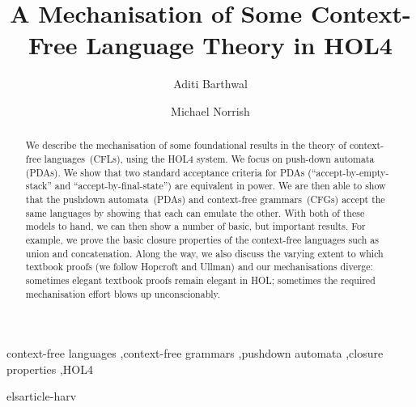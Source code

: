 \documentclass[1p,review,authoryear]{elsarticle}
\begin{document}
\begin{frontmatter}
\date{}

\title{A Mechanisation of Some Context-Free Language Theory in HOL4}

\author[ab]{Aditi Barthwal}
\author[mn]{ Michael Norrish}
\address[ab]{Australian National University}
\address[mn]{Canberra Research Lab., NICTA}



\begin{abstract}
We describe the mechanisation of some foundational results in the theory of context-free languages~(CFLs), using the HOL4 system.
We focus on push-down automata (PDAs).
We show that two standard acceptance criteria for PDAs (``accept-by-empty-stack'' and ``accept-by-final-state'') are equivalent in power.
We are then able to show that the pushdown automata~(PDAs) and context-free grammars~(CFGs) accept the same languages by showing that each can emulate the other.
With both of these models to hand, we can then show a number of basic, but important results.
For example, we prove the basic closure properties of the context-free languages such as union and concatenation.
Along the way, we also discuss the varying extent to which textbook proofs (we follow Hopcroft and Ullman) and our mechanisations diverge: sometimes elegant textbook proofs remain elegant in HOL; sometimes the required mechanisation effort blows up unconscionably.
\end{abstract}

\begin{keyword}
context-free languages \sep context-free grammars \sep pushdown automata \sep closure properties \sep HOL4
\end{keyword}
\end{frontmatter}










 {elsarticle-harv}

\end{document}
